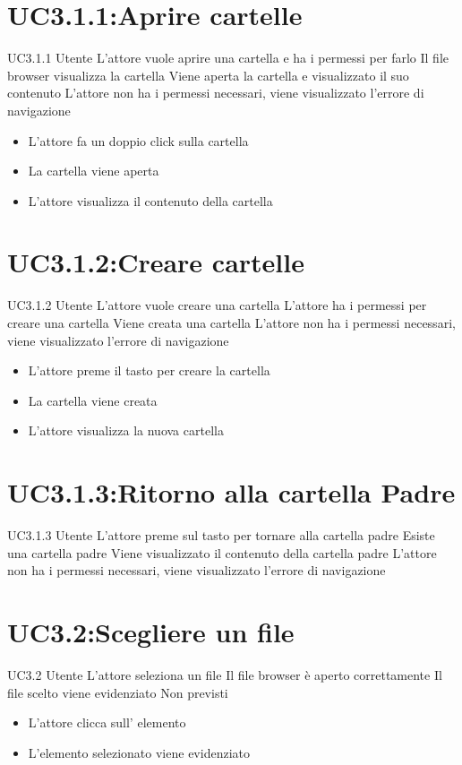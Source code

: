 \documentclass[../AnalisideiRequisiti.tex]{subfiles}
\begin{document}
	\section{UC3.1.1:Aprire cartelle}
	\UserCase
	{UC3.1.1}
	{Utente}
	{}
	{L'attore vuole aprire una cartella e ha i permessi per farlo}
	{Il file browser visualizza la cartella}
	{Viene aperta la cartella e visualizzato il suo contenuto}
	{L'attore non ha i permessi necessari, viene visualizzato l'errore di navigazione }
	{
		\begin{itemize}
			\item{} L'attore fa un doppio click sulla cartella
			\item{} La cartella viene aperta
			\item{} L'attore visualizza il contenuto della cartella
		\end{itemize}
	}
	\section{UC3.1.2:Creare cartelle}
	\UserCase
	{UC3.1.2}
	{Utente}
	{}
	{L'attore vuole creare una cartella}
	{L'attore ha i permessi per creare una cartella}
	{Viene creata una cartella}
	{L'attore non ha i permessi necessari, viene visualizzato l'errore di navigazione }
	{
		\begin{itemize}
		\item{} L'attore preme il tasto per creare la cartella
		\item{} La cartella viene creata
		\item{} L'attore visualizza la nuova cartella
		\end{itemize}
	}

	\section{UC3.1.3:Ritorno alla cartella Padre}
\UserCase
{UC3.1.3}
{Utente}
{}
{L'attore preme sul tasto per tornare alla cartella padre}
{Esiste una cartella padre}
{Viene visualizzato il contenuto della cartella padre}
{L'attore non ha i permessi necessari, viene visualizzato l'errore di navigazione }
{}
	\section{UC3.2:Scegliere un file}
\UserCase
{UC3.2}
{Utente}
{}
{L'attore seleziona un file}
{Il file browser è aperto correttamente}
{Il file scelto viene evidenziato}
{Non previsti}
{
	\begin{itemize}
		\item{} L'attore clicca sull' elemento
		\item{} L'elemento selezionato viene evidenziato
	\end{itemize}
}
\end{document}

